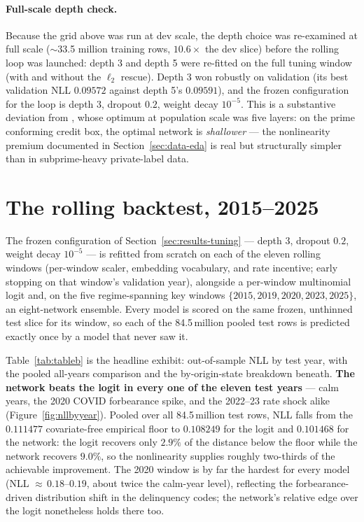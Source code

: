 \paragraph{Full-scale depth check.}  Because the grid above was run
at dev scale, the depth choice was re-examined at full scale
($\sim$33.5 million training rows, $10.6\times$ the dev slice) before
the rolling loop was launched: depth 3 and depth 5 were re-fitted on
the full tuning window (with and without the $\ell_2$ rescue).  Depth
3 won robustly on validation (its best validation NLL $0.09572$
against depth 5's $0.09591$), and the frozen configuration for the
loop is depth 3, dropout $0.2$, weight decay $10^{-5}$.  This is a substantive deviation from
\citet{sirignano2021}, whose optimum at population scale was five
layers: on the prime conforming credit box, the optimal network is
\emph{shallower} --- the nonlinearity premium documented in
Section~\ref{sec:data-eda} is real but structurally simpler than in
subprime-heavy private-label data.

\section{The rolling backtest, 2015--2025}
\label{sec:results-rolling}

The frozen configuration of Section~\ref{sec:results-tuning} --- depth
3, dropout $0.2$, weight decay $10^{-5}$ --- is refitted from scratch
on each of the eleven rolling windows (per-window scaler, embedding
vocabulary, and rate incentive; early stopping on that window's
validation year), alongside a per-window multinomial logit and, on the
five regime-spanning key windows $\{2015, 2019, 2020, 2023, 2025\}$,
an eight-network ensemble.  Every model is scored on the same frozen,
unthinned test slice for its window, so each of the 84.5\,million
pooled test rows is predicted exactly once by a model that never saw
it.

Table~\ref{tab:tableb} is the headline exhibit: out-of-sample NLL by
test year, with the pooled all-years comparison and the by-origin-state
breakdown beneath.  \textbf{The network beats the logit in every one of
the eleven test years} --- calm years, the 2020 COVID forbearance
spike, and the 2022--23 rate shock alike
(Figure~\ref{fig:nllbyyear}).  Pooled over all 84.5\,million test rows,
NLL falls from the $0.111477$ covariate-free empirical floor to
$0.108249$ for the logit and $0.101468$ for the network: the logit
recovers only $2.9\%$ of the distance below the floor while the network
recovers $9.0\%$, so the nonlinearity supplies roughly two-thirds of
the achievable improvement.  The 2020 window is by far the hardest for
every model (NLL ${\approx}\,0.18$--$0.19$, about twice the calm-year
level), reflecting the forbearance-driven distribution shift in the
delinquency codes; the network's relative edge over the logit
nonetheless holds there too.

